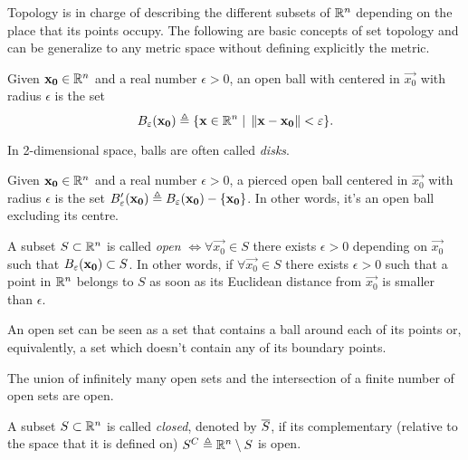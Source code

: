 Topology is in charge of describing the different subsets of $\Rtn$ depending on the place that its points occupy. The
following are basic concepts of set topology and can be generalize to any metric space without defining explicitly the metric.

\begin{defn}
Given $\vec{x_0}\in\Rtn$ and a real number $\epsilon > 0$, an open ball with centered in $\vec{x_0}$ with radius $\epsilon$ is the set
\begin{equation}
B_\epsilon\argopen(\vec{x_0}\argclose)\bydef\{\vec{x}\in\Rtn\st\vnorm{\vec{x} - \vec{x_0}} < \epsilon\}.
\end{equation}
\end{defn}

\begin{note}
	In 2-dimensional space, balls are often called \textit{disks}.
\end{note}

\begin{defn}
Given $\vec{x_0}\in\Rtn$ and a real number $\epsilon > 0$, a pierced open ball centered in $\vec{x_0}$ with radius $\epsilon$ is the
set $B'_\epsilon\argopen(\vec{x_0}\argclose)\bydef B_\epsilon\argopen(\vec{x_0}\argclose) - \{\vec{x_0}\}$. In other words, it's an 
open ball excluding its centre.
\end{defn}

\begin{defn}
	A subset $S\subset\Rtn$ is called \textit{open} $\iff\forall\vec{x_0}\in S$ there exists $\epsilon > 0$ depending on $\vec{x_0}$ such that $B_\epsilon\argopen(\vec{x_0}\argclose)\subset S$. In other words, if $\forall\vec{x_0}\in S$ there exists $\epsilon > 0$
	such that a point in $\Rtn$ belongs to $S$ as soon as its Euclidean distance from $\vec{x_0}$ is smaller than $\epsilon$. 
\end{defn}

\begin{note}
An open set can be seen as a set that contains a ball around each of its points or, equivalently, a set which doesn't contain any of
its boundary points.
\end{note}

\begin{prop}
The union of infinitely many open sets and the intersection of a finite number of open sets are open.
\end{prop}

\begin{defn}
	A subset $S\subset\Rtn$ is called \textit{closed}, denoted by $\overline{S}$, if its complementary (relative to the space that it is defined on) $S^C \bydef\Rtn\setminus S$ is open. 
\end{defn}

